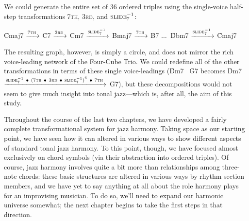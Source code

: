 We could generate the entire set of 36 ordered triples
using the single-voice half-step transformations \textsc{7th}, \textsc{3rd},
and $\text{\textsc{slide}}_7^{-1}$:%
%
\begin{center}
  \h{Cmaj7} $\xrightarrow{\text{7\textsc{th}}\,}$
  \h{C7}  $\xrightarrow{\text{3\textsc{rd}}\,}$
  \h{Cm7} $\xrightarrow{\text{\textsc{slide}}_7^{-1}\,}$
  \h{Bmaj7} $\xrightarrow{\text{7\textsc{th}}\,}$
  \h{B7}  $\ldots\ $
  \h{Dbm7} $\xrightarrow{\text{\textsc{slide}}_7^{-1}\,}$
  \h{Cmaj7}
\end{center}%
%
The resulting graph, however, is simply a circle, and does not mirror the rich
voice-leading network of the Four-Cube Trio. We could redefine all of the
other transformations in terms of these single voice-leadings (\h{Dm7}
\TFarrow\ \h{G7} becomes \h{Dm7}
$\xrightarrow{\text{\textsc{slide}}_7^{-1}\ \bullet\ {(\text{7\textsc{th}}\ \bullet\
  \text{3\textsc{rd}}\ \bullet\ \text{\textsc{slide}}_7^{-1})}^6\ \bullet\
  7\text{\textsc{th}}\,}$
\h{G7}), but these decompositions would not seem to give much insight into
tonal jazz---which is, after all, the aim of this study.

Throughout the course of the last two chapters, we have developed a fairly
complete transformational system for jazz harmony. Taking \tf space as our
starting point, we have seen how it can altered in various ways to show
different aspects of standard tonal jazz harmony. To this point, though, we
have focused almost exclusively on chord symbols (via their abstraction into
ordered triples). Of course, jazz harmony involves quite a bit more than
relationships among three-note chords: these basic structures are altered in
various ways by rhythm section members, and we have yet to say anything at all
about the role harmony plays for an improvising musician. To do so, we'll need
to expand our harmonic universe somewhat; the next chapter begins to take the
first steps in that direction.


